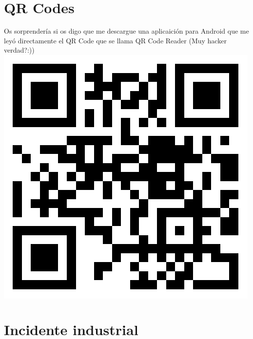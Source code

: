 \documentclass[11pt, spanish]{report}
\begin{document}
\section*{QR Codes}
Os sorprendería si os digo que me descargue una aplicaición para Android que me leyó directamente el QR Code que se llama QR Code Reader (Muy hacker verdad?:)) \\
\includegraphics[width=\textwidth,height=\textwidth]{qr.png}

\section*{Incidente industrial}
\end{document}
